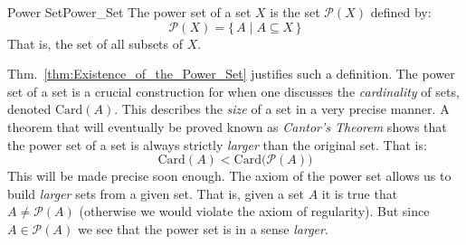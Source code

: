         \begin{fdefinition}{Power Set}{Power_Set}
            The power set of a set $X$ is the set $\mathcal{P}(X)$ defined by:
            \begin{equation*}
                \mathcal{P}(X)=\{\,A\;|\;A\subseteq{X}\,\}
            \end{equation*}
            That is, the set of all subsets of $X$.
        \end{fdefinition}
        Thm.~\ref{thm:Existence_of_the_Power_Set} justifies such a definition.
        The power set of a set is a crucial construction for when one discusses
        the \textit{cardinality} of sets, denoted $\textrm{Card}(A)$. This
        describes the \textit{size} of a set in a very precise manner. A theorem
        that will eventually be proved known as
        \textit{Cantor's Theorem} shows that
        the power set of a set is always strictly \textit{larger} than the
        original set. That is:
        \begin{equation}
            \textrm{Card}(A)<\textrm{Card}\big(\mathcal{P}(A)\big)
        \end{equation}
        This will be made precise soon enough. The axiom of the power set allows
        us to build \textit{larger} sets from a given set. That is, given a set
        $A$ it is true that $A\ne\mathcal{P}(A)$ (otherwise we would violate the
        axiom of regularity). But since $A\in\mathcal{P}(A)$ we see that the
        power set is in a sense \textit{larger}.
